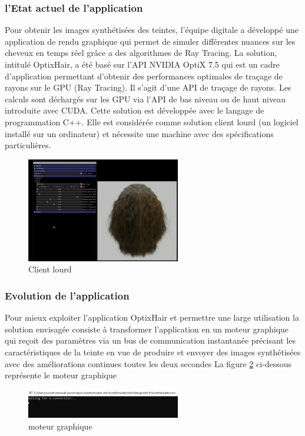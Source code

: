 \subsubsection{l’Etat actuel de l’application}
Pour obtenir les images synthétisées des teintes, l’équipe digitale a développé une application de rendu graphique qui permet de simuler différentes nuances sur les cheveux en temps réel grâce a des algorithmes de Ray Tracing. La solution, intitulé OptixHair, a été basé sur l'API NVIDIA OptiX 7.5 qui est un cadre d'application permettant d'obtenir des performances optimales de traçage de rayons sur le GPU (Ray Tracing). Il s'agit d'une API de traçage de rayons. Les calculs sont déchargés sur les GPU via l'API de bas niveau ou de haut niveau introduite avec CUDA.
Cette solution est développée avec le langage de programmation C++. Elle est considérée comme solution client lourd (un logiciel installé sur un ordinateur) et nécessite une machine avec des spécifications particulières.

\begin{figure}[!ht]\centering
\includegraphics[width=0.6\textwidth]{chapitres/chapitre3/figures/old.png}
\caption{Client lourd} 
\label{fig:ec1}
\end{figure}

\newpage
\subsubsection{Evolution de l’application }
Pour mieux exploiter l’application OptixHair et permettre une large utilisation la solution envisagée consiste à transformer l’application en un moteur graphique qui reçoit des paramètres via un bus de communication instantanée précisant les caractéristiques de la teinte en vue de produire et envoyer des images synthétisées avec des améliorations continues toutes les deux secondes
La figure \ref{fig:mgraphique} ci-dessous représente le moteur graphique 

\begin{figure}[!ht]\centering
\includegraphics[width=0.6\textwidth]{chapitres/chapitre3/figures/console.png}
\caption{moteur graphique} 
\label{fig:mgraphique}
\end{figure}

